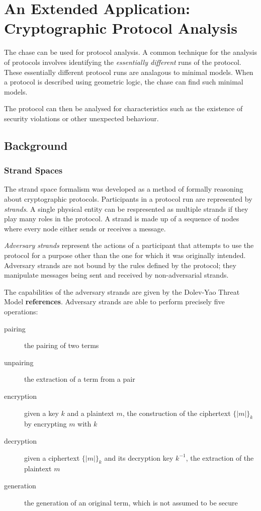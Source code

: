 \section{An Extended Application: \\ Cryptographic Protocol Analysis}

	The chase can be used for protocol analysis. A common technique for the analysis
	of protocols involves identifying the \emph{essentially different} runs of
	the protocol. These essentially different protocol runs are analagous to
	minimal models. When a protocol is described using geometric logic, the
	chase can find such minimal models.

	The protocol can then be analysed for characteristics such as the
	existence of security violations or other unexpected behaviour.

	\subsection{Background}

		\subsubsection{Strand Spaces}

			The strand space formalism was developed as a method of formally
			reasoning about cryptographic protocols. Participants in a protocol
			run are represented by \emph{strands}. A single physical entity can
			be respresented as multiple strands if they play many roles in the
			protocol. A strand is made up of a sequence of nodes where every
			node either sends or receives a message.

			\emph{Adversary strands} represent the actions of a participant
			that attempts to use the protocol for a purpose other than the one
			for which it was originally intended. Adversary strands are not
			bound by the rules defined by the protocol; they manipulate
			messages being sent and received by non-adversarial strands.

			The capabilities of the adversary strands are given by the
			Dolev-Yao Threat Model \textbf{references}. Adversary strands are
			able to perform precisely five operations:

			\begin{description}
			\item [pairing] the pairing of two terms
			\item [unpairing] the extraction of a term from a pair
			\item [encryption] given a key $k$ and a plaintext $m$, the construction of the ciphertext $\{|m|\}_k$ by encrypting $m$ with $k$
			\item [decryption] given a ciphertext $\{|m|\}_k$ and its decryption key $k^{-1}$, the extraction of the plaintext $m$
			\item [generation] the generation of an original term, which is not assumed to be secure
			\end{description}

